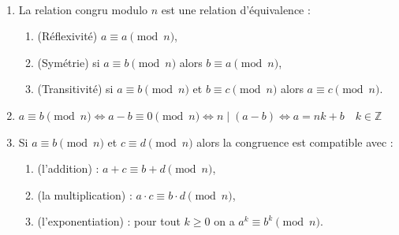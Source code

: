 \begin{proposition}
~

\label{thm-cong}

\vspace{-8mm}
\begin{enumerate}
  \item La relation \og congru modulo $n$ \fg{} est une relation d'équivalence :
  
  \vspace{-1mm}
  \begin{enumerate}[label=\roman*),left=0mm]
    \item (Réflexivité) $a \equiv a \pmod n$,
    \item (Symétrie) si $a \equiv b \pmod n$ alors $b \equiv a \pmod n$,
    \item (Transitivité) si $a \equiv b \pmod n$ et $b \equiv c \pmod n$ alors $a \equiv c \pmod n$.
  \end{enumerate}
  \item $a \equiv b \pmod n \iff a - b \equiv 0 \pmod n \iff n \mid (a - b) \iff a = nk + b \quad k \in \mathbb{Z}$
  
  \item Si $a \equiv b \pmod n$ et $c \equiv d \pmod n$ alors  la congruence est compatible avec :
  
  \begin{enumerate}[label=\roman*),left=0mm]
  	\item (l’addition) :  $a+c \equiv b+d \pmod n$,
  	\item (la multiplication) : $a\cdot c \equiv b\cdot d \pmod n$,
  	\item (l'exponentiation) :  pour tout $k \geqslant 0$\; on a\; $a^k \equiv b^k \pmod n$.
  \end{enumerate}
  
\end{enumerate}
\end{proposition}



